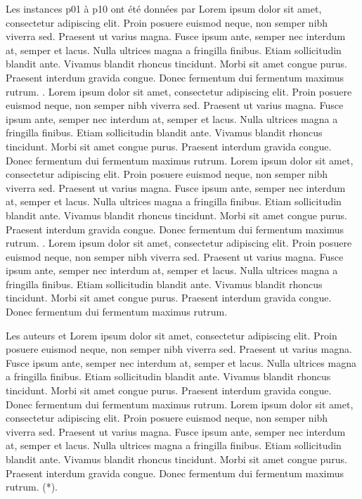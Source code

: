 Les instances p01 à p10 ont été données par \parencite{eilon_distribution_1971} Lorem ipsum dolor sit amet, consectetur adipiscing elit. Proin posuere euismod neque, non semper nibh viverra sed. Praesent ut varius magna. Fusce ipsum ante, semper nec interdum at, semper et lacus. Nulla ultrices magna a fringilla finibus. Etiam sollicitudin blandit ante. Vivamus blandit rhoncus tincidunt. Morbi sit amet congue purus. Praesent interdum gravida congue. Donec fermentum dui fermentum maximus rutrum. \parencite{christofides_period_1984}. Lorem ipsum dolor sit amet, consectetur adipiscing elit. Proin posuere euismod neque, non semper nibh viverra sed. Praesent ut varius magna. Fusce ipsum ante, semper nec interdum at, semper et lacus. Nulla ultrices magna a fringilla finibus. Etiam sollicitudin blandit ante. Vivamus blandit rhoncus tincidunt. Morbi sit amet congue purus. Praesent interdum gravida congue. Donec fermentum dui fermentum maximus rutrum. \parencite{chao_new_1995} Lorem ipsum dolor sit amet, consectetur adipiscing elit. Proin posuere euismod neque, non semper nibh viverra sed. Praesent ut varius magna. Fusce ipsum ante, semper nec interdum at, semper et lacus. Nulla ultrices magna a fringilla finibus. Etiam sollicitudin blandit ante. Vivamus blandit rhoncus tincidunt. Morbi sit amet congue purus. Praesent interdum gravida congue. Donec fermentum dui fermentum maximus rutrum. \parencite{cordeau_tabu_1997}. Lorem ipsum dolor sit amet, consectetur adipiscing elit. Proin posuere euismod neque, non semper nibh viverra sed. Praesent ut varius magna. Fusce ipsum ante, semper nec interdum at, semper et lacus. Nulla ultrices magna a fringilla finibus. Etiam sollicitudin blandit ante. Vivamus blandit rhoncus tincidunt. Morbi sit amet congue purus. Praesent interdum gravida congue. Donec fermentum dui fermentum maximus rutrum.

\medskip

Les auteurs \parencite{liu_hybridization_2014} et \parencite{cacchiani_set-covering_2014} Lorem ipsum dolor sit amet, consectetur adipiscing elit. Proin posuere euismod neque, non semper nibh viverra sed. Praesent ut varius magna. Fusce ipsum ante, semper nec interdum at, semper et lacus. Nulla ultrices magna a fringilla finibus. Etiam sollicitudin blandit ante. Vivamus blandit rhoncus tincidunt. Morbi sit amet congue purus. Praesent interdum gravida congue. Donec fermentum dui fermentum maximus rutrum. \parencite{chao_new_1995} Lorem ipsum dolor sit amet, consectetur adipiscing elit. Proin posuere euismod neque, non semper nibh viverra sed. Praesent ut varius magna. Fusce ipsum ante, semper nec interdum at, semper et lacus. Nulla ultrices magna a fringilla finibus. Etiam sollicitudin blandit ante. Vivamus blandit rhoncus tincidunt. Morbi sit amet congue purus. Praesent interdum gravida congue. Donec fermentum dui fermentum maximus rutrum. (*). 

